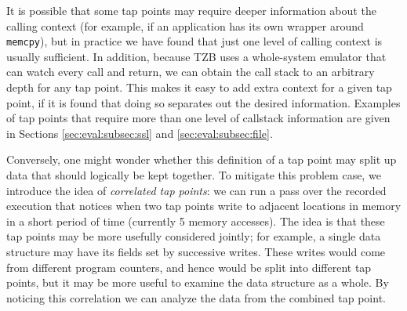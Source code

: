 It is possible that some tap points may require deeper information about
the calling context (for example, if an application has its own wrapper
around \texttt{memcpy}), but in practice we have found that just one
level of calling context is usually sufficient. In addition, because TZB
uses a whole-system emulator that can watch every call and return, we
can obtain the call stack to an arbitrary depth for any tap point. This
makes it easy to add extra context for a given tap point, if it is found
that doing so separates out the desired information. Examples of tap
points that require more than one level of callstack information are
given in Sections \ref{sec:eval:subsec:ssl} and
\ref{sec:eval:subsec:file}.

Conversely, one might wonder whether this definition of a tap point may
split up data that should logically be kept together. To mitigate this
problem case, we introduce the idea of \emph{correlated tap points}: we
can run a pass over the recorded execution that notices when two tap
points write to adjacent locations in memory in a short period of time
(currently 5 memory accesses). The idea is that these tap points may be
more usefully considered jointly; for example, a single data structure
may have its fields set by successive writes. These writes would come
from different program counters, and hence would be split into different
tap points, but it may be more useful to examine the data structure as a
whole. By noticing this correlation we can analyze the data from the
combined tap point.
